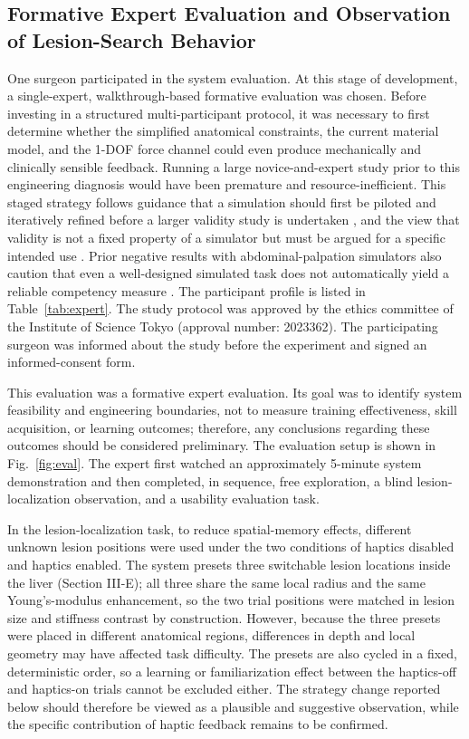 \documentclass{ieeeaccess}
\begin{document}
\subsection{Formative Expert Evaluation and Observation of Lesion-Search Behavior}
One surgeon participated in the system evaluation. At this stage of development, a single-expert, walkthrough-based formative evaluation was chosen. Before investing in a structured multi-participant protocol, it was necessary to first determine whether the simplified anatomical constraints, the current material model, and the 1-DOF force channel could even produce mechanically and clinically sensible feedback. Running a large novice-and-expert study prior to this engineering diagnosis would have been premature and resource-inefficient. This staged strategy follows guidance that a simulation should first be piloted and iteratively refined before a larger validity study is undertaken \cite{cheng2016reporting,dasilva2019piloting}, and the view that validity is not a fixed property of a simulator but must be argued for a specific intended use \cite{cook2016validation,borgersen2018gathering}. Prior negative results with abdominal-palpation simulators also caution that even a well-designed simulated task does not automatically yield a reliable competency measure \cite{xu2023difficulties}. The participant profile is listed in Table~\ref{tab:expert}. The study protocol was approved by the ethics committee of the Institute of Science Tokyo (approval number: 2023362). The participating surgeon was informed about the study before the experiment and signed an informed-consent form.

This evaluation was a formative expert evaluation. Its goal was to identify system feasibility and engineering boundaries, not to measure training effectiveness, skill acquisition, or learning outcomes; therefore, any conclusions regarding these outcomes should be considered preliminary. The evaluation setup is shown in Fig.~\ref{fig:eval}. The expert first watched an approximately 5-minute system demonstration and then completed, in sequence, free exploration, a blind lesion-localization observation, and a usability evaluation task.

In the lesion-localization task, to reduce spatial-memory effects, different unknown lesion positions were used under the two conditions of haptics disabled and haptics enabled. The system presets three switchable lesion locations inside the liver (Section III-E); all three share the same local radius and the same Young's-modulus enhancement, so the two trial positions were matched in lesion size and stiffness contrast by construction. However, because the three presets were placed in different anatomical regions, differences in depth and local geometry may have affected task difficulty. The presets are also cycled in a fixed, deterministic order, so a learning or familiarization effect between the haptics-off and haptics-on trials cannot be excluded either. The strategy change reported below should therefore be viewed as a plausible and suggestive observation, while the specific contribution of haptic feedback remains to be confirmed.
\end{document}
